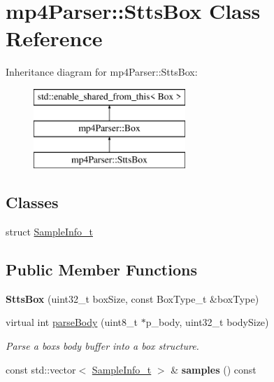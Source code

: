\hypertarget{classmp4_parser_1_1_stts_box}{}\section{mp4\+Parser\+::Stts\+Box Class Reference}
\label{classmp4_parser_1_1_stts_box}
Inheritance diagram for mp4\+Parser\+::Stts\+Box\+:\begin{figure}[H]
\begin{center}
\leavevmode
\includegraphics[height=3.000000cm]{classmp4_parser_1_1_stts_box}
\end{center}
\end{figure}
\subsection*{Classes}
\begin{DoxyCompactItemize}
\item 
struct \mbox{\hyperlink{structmp4_parser_1_1_stts_box_1_1_sample_info__t}{Sample\+Info\+\_\+t}}
\end{DoxyCompactItemize}
\subsection*{Public Member Functions}
\begin{DoxyCompactItemize}
\item 
\mbox{\label{classmp4_parser_1_1_stts_box_a7d22d7fc404fdd17db188d877479a7ab}} 
{\bfseries Stts\+Box} (uint32\+\_\+t box\+Size, const Box\+Type\+\_\+t \&box\+Type)
\item 
virtual int \mbox{\hyperlink{classmp4_parser_1_1_stts_box_a227b3d37201475d3c3deef99fda2323a}{parse\+Body}} (uint8\+\_\+t $\ast$p\+\_\+body, uint32\+\_\+t body\+Size)
\begin{DoxyCompactList}\small\item\em Parse a box\textquotesingle{}s body buffer into a box structure. \end{DoxyCompactList}\item 
\mbox{\label{classmp4_parser_1_1_stts_box_a37c3c0a372e199227682d18b4792f61c}} 
const std\+::vector$<$ \mbox{\hyperlink{structmp4_parser_1_1_stts_box_1_1_sample_info__t}{Sample\+Info\+\_\+t}} $>$ \& {\bfseries samples} () const
\end{DoxyCompactItemize}
